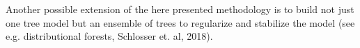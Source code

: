 \documentclass[twoside]{report}
\begin{document}
Another possible extension of the here presented methodology is to build not just one tree 
model but an ensemble of trees to regularize and stabilize the model 
(see e.g. distributional forests, Schlosser et. al, 2018).



\bigskip






\end{document}
